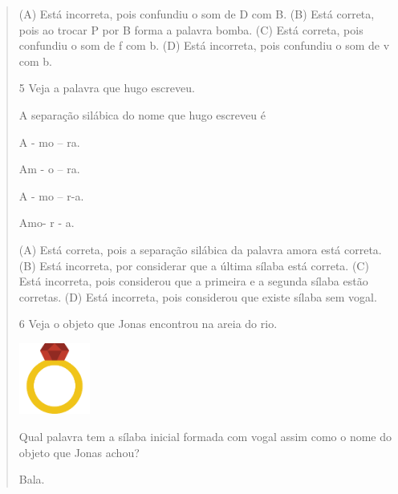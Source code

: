\begin{verse}
(A) Está incorreta, pois confundiu o som de D com B.
(B) Está correta, pois ao trocar P por B forma a palavra bomba.
(C) Está correta, pois confundiu o som de f com b.
(D) Está incorreta, pois confundiu o som de v com b.

\num{5} Veja a palavra que hugo escreveu.

A separação silábica do nome que hugo escreveu é

\begin{minipage}{.5\textwidth}
\begin{escolha}
\item A - mo -- ra.

\item Am - o -- ra.

\item A - mo -- r-a.

\item Amo- r - a.
\end{escolha}
\end{minipage}

(A) Está correta, pois a separação silábica da palavra amora está correta.
(B) Está incorreta, por considerar que a última sílaba está correta.
(C) Está incorreta, pois considerou que a primeira e a segunda sílaba estão corretas.
(D) Está incorreta, pois considerou que existe sílaba sem vogal.

\num{6} Veja o objeto que Jonas encontrou na areia do rio.

\includegraphics[width=0.92222in,height=0.92222in]{media/image151.png}


Qual palavra tem a sílaba inicial formada com vogal assim como o nome do objeto que Jonas achou?

\begin{minipage}{.5\textwidth}
\begin{escolha}
\item Bala.


\end{escolha}
\end{minipage}
\end{verse}
